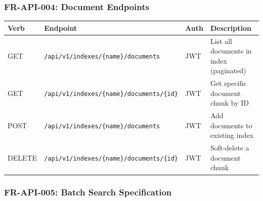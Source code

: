 \documentclass[11pt,a4paper]{article}
\newcommand{\apipath}[1]{\texttt{\small\textcolor{ctAccentBlue}{#1}}}
\begin{document}
\subsubsection{FR-API-004: Document Endpoints}

\begin{longtable}{@{}p{1.5cm}p{4.5cm}p{3cm}p{5cm}@{}}
\toprule
\textbf{Verb} & \textbf{Endpoint} & \textbf{Auth} & \textbf{Description} \\
\midrule
\endhead
GET & \apipath{/api/v1/indexes/\{name\}/documents} & JWT & List all documents in index (paginated) \\
GET & \apipath{/api/v1/indexes/\{name\}/documents/\{id\}} & JWT & Get specific document chunk by ID \\
POST & \apipath{/api/v1/indexes/\{name\}/documents} & JWT & Add documents to existing index \\
DELETE & \apipath{/api/v1/indexes/\{name\}/documents/\{id\}} & JWT & Soft-delete a document chunk \\
\bottomrule
\end{longtable}

\subsubsection{FR-API-005: Batch Search Specification}
\end{document}
